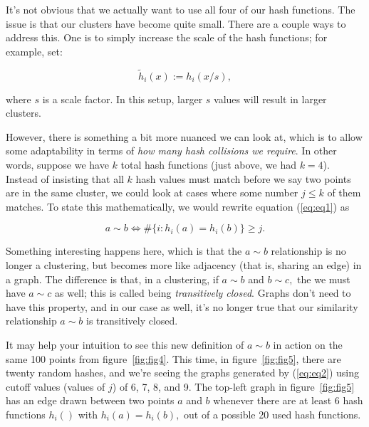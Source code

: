 \documentclass[20pt,]{extarticle}
\begin{document}
It's not obvious that we actually want to use all four of our hash
functions. The issue is that our clusters have become quite small. There
are a couple ways to address this. One is to simply increase the scale
of the hash functions; for example, set:

\[ \tilde h_i(x) := h_i(x/s), \]

where \(s\) is a scale factor. In this setup, larger \(s\) values will
result in larger clusters.

However, there is something a bit more nuanced we can look at, which is
to allow some adaptability in terms of \emph{how many hash collisions we
require}. In other words, suppose we have \(k\) total hash functions
(just above, we had \(k=4\)). Instead of insisting that all \(k\) hash
values must match before we say two points are in the same cluster, we
could look at cases where some number \(j \le k\) of them matches. To
state this mathematically, we would rewrite equation (\ref{eq:eq1}) as

\begin{equation} a \sim b \iff \#\{i: h_i(a) = h_i(b)\} \ge j. \label{eq:eq2}\end{equation}

Something interesting happens here, which is that the \(a \sim b\)
relationship is no longer a clustering, but becomes more like adjacency
(that is, sharing an edge) in a graph. The difference is that, in a
clustering, if \(a\sim b\) and \(b\sim c,\) the we must have \(a\sim c\)
as well; this is called being \emph{transitively closed}. Graphs don't
need to have this property, and in our case as well, it's no longer true
that our similarity relationship \(a\sim b\) is transitively closed.

It may help your intuition to see this new definition of \(a\sim b\) in
action on the same 100 points from figure~\ref{fig:fig4}. This time, in
figure~\ref{fig:fig5}, there are twenty random hashes, and we're seeing
the graphs generated by (\ref{eq:eq2}) using cutoff values (values of
\(j\)) of 6, 7, 8, and 9. The top-left graph in figure~\ref{fig:fig5}
has an edge drawn between two points \(a\) and \(b\) whenever there are
at least 6 hash functions \(h_i()\) with \(h_i(a) = h_i(b),\) out of a
possible 20 used hash functions.
\end{document}
